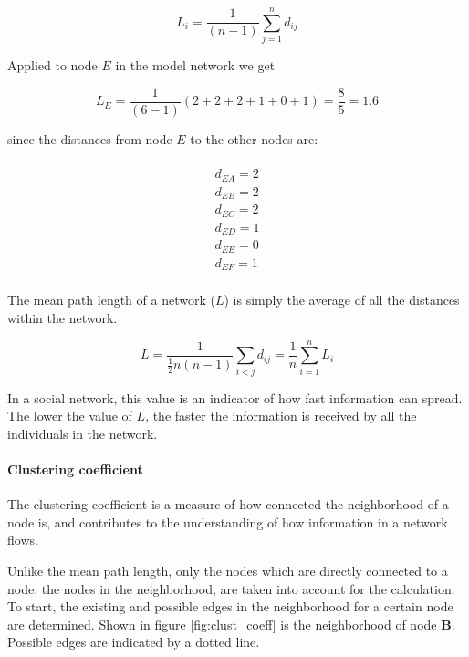 \begin{equation}
L_i = \frac{1}{(n-1)}\sum^n_{j=1} d_{ij}
\label{eq:average_path_lenght}
\end{equation}

Applied to node $E$ in the model network we get

\begin{equation}
L_E = \frac{1}{(6-1)}(2 + 2 + 2 + 1 + 0 + 1) = \frac{8}{5} = 1.6
\label{eq:average_path_lenght_e}
\end{equation}

since the distances from node $E$ to the other nodes are:

\begin{multline} 
\\d_{EA} = 2 \\
d_{EB} = 2 \\
d_{EC} = 2 \\
d_{ED} = 1 \\
d_{EE} = 0 \\
d_{EF} = 1 \\
\label{eq:distances_e}
\end{multline}

The mean path length of a network ($L$) is simply the average of all the distances within the network.

\begin{equation}
L = \frac{1}{ \frac{1}{2}n(n-1)}\sum_{i<j} d_{ij} = \frac{1}{n}\sum^n_{i=1}L_i
\label{eq:mean_path_lenght}
\end{equation} 

In a social network, this value is an indicator of how fast information can spread. The lower the value of $L$, the faster the information is received by all the individuals in the network. 

\paragraph{Clustering coefficient}

The clustering coefficient is a measure of how connected the neighborhood of a node is, and contributes to the understanding of how information in a network flows.

Unlike the mean path length, only the nodes which are directly connected to a node, the nodes in the neighborhood, are taken into account for the calculation. To start, the existing and possible edges in the neighborhood for a certain node are determined. Shown in figure \ref{fig:clust_coeff} is the neighborhood of node \textbf{B}. Possible edges are indicated by a dotted line.

